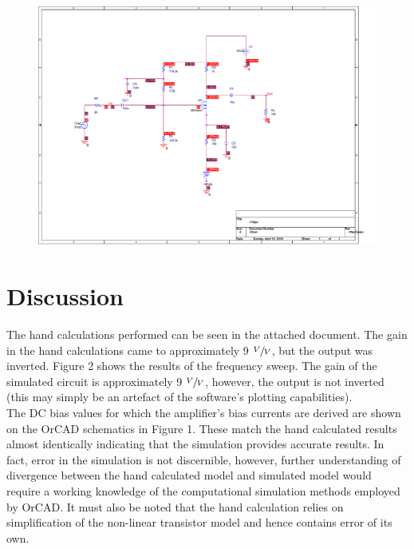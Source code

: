 \documentclass{article}
\begin{document}
\begin{figure}[H]
	\centering
	\includegraphics[width=1.00\textwidth]{pic1.pdf}
\end{figure}


\section{Discussion}

The hand calculations performed can be seen in the attached document. The gain in the hand calculations came to approximately 9 $\sfrac{V}{V}$, but the output was inverted. Figure 2 shows the results of the frequency sweep. The gain of the simulated circuit is approximately 9 $\sfrac{V}{V}$, however, the output is not inverted (this may simply be an artefact of the software's plotting capabilities).\\

The DC bias values for which the amplifier's bias currents are derived are shown on the OrCAD schematics in Figure 1. These match the hand calculated results almost identically indicating that the simulation provides accurate results. In fact, error in the simulation is not discernible, however, further understanding of divergence between the hand calculated model and simulated model would require a working knowledge of the computational simulation methods employed by OrCAD. It must also be noted that the hand calculation relies on simplification of the non-linear transistor model and hence contains error of its own.
\end{document}
